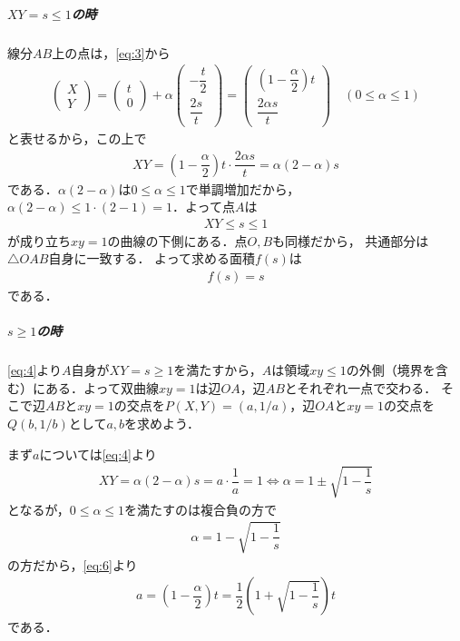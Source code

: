 \documentclass[../../main.tex]{subfiles}
\begin{document}
\subparagraph{$XY=s\le1$の時}

線分$AB$上の点は，\cref{eq:3}から
\begin{align}
  \begin{pmatrix} X \\ Y
  \end{pmatrix}
  =
  \begin{pmatrix} t \\ 0
  \end{pmatrix} + \alpha
  \begin{pmatrix} -\dfrac{t}{2} \\[6pt] \dfrac{2s}{t}
  \end{pmatrix}
  =
  \begin{pmatrix} \left(1-\dfrac{\alpha}{2}\right)t \\[6pt] \dfrac{2\alpha s}{t}
  \end{pmatrix} \quad (0\le\alpha\le1) \label{eq:5}
\end{align}
と表せるから，この上で
\begin{align}
  XY=\left(1-\dfrac{\alpha}{2}\right)t\cdot\dfrac{2\alpha s}{t}=\alpha(2-\alpha)s \label{eq:6}
\end{align}
である．$\alpha(2-\alpha)$は$0\le\alpha\le1$で単調増加だから，$\alpha(2-\alpha)\le1\cdot(2-1)=1$．よって点$A$は
\begin{align}
  XY\le s\le1
\end{align}
が成り立ち$xy=1$の曲線の下側にある．点$O,B$も同様だから，
共通部分は$\triangle OAB$自身に一致する．
よって求める面積$f(s)$は
\begin{align}
  f(s)=s \label{eq:7}
\end{align}
である．

\subparagraph{$s\ge1$の時}

\cref{eq:4}より$A$自身が$XY=s\ge1$を満たすから，$A$は領域$xy\le1$の外側（境界を含む）にある．よって双曲線$xy=1$は辺$OA$，辺$AB$とそれぞれ一点で交わる．
そこで辺$AB$と$xy=1$の交点を$P(X,Y)=(a,1/a)$，辺$OA$と$xy=1$の交点を$Q(b,1/b)$として$a,b$を求めよう．

まず$a$については\cref{eq:4}より
\begin{align}
  XY = \alpha(2-\alpha)s = a\cdot\dfrac{1}{a} = 1 \iff \alpha=1\pm\sqrt{1-\dfrac{1}{s}}
\end{align}
となるが，$0\le\alpha\le1$を満たすのは複合負の方で
\begin{align}
  \alpha=1-\sqrt{1-\dfrac{1}{s}} \label{eq:8}
\end{align}
の方だから，\cref{eq:6}より
\begin{align}
  a=\left(1-\dfrac{\alpha}{2}\right)t=\dfrac{1}{2}\left(1+\sqrt{1-\dfrac{1}{s}}\right)t \label{eq:9}
\end{align}
である．
\end{document}
